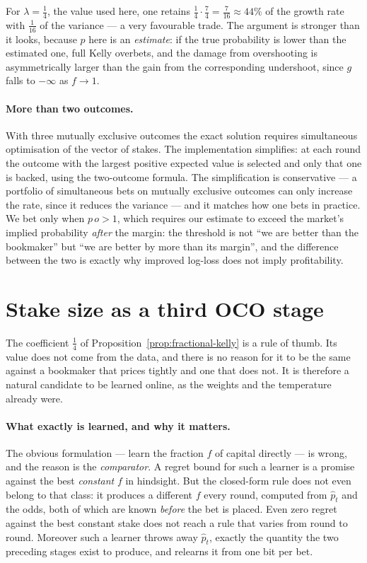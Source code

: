 \documentclass[12pt,a4paper,oneside]{report}
\renewcommand{\_}{\oldunderscore\allowbreak}
\theoremstyle{definition}
\theoremstyle{plain}
\theoremstyle{remark}
\begin{document}
For $\lambda=\tfrac14$, the value used here, one retains
$\tfrac14\cdot\tfrac74 = \tfrac{7}{16} \approx 44\%$ of the growth rate with $\tfrac{1}{16}$ of
the variance --- a very favourable trade. The argument is stronger than it looks, because $p$
here is an \emph{estimate}: if the true probability is lower than the estimated one, full Kelly
overbets, and the damage from overshooting is asymmetrically larger than the gain from the
corresponding undershoot, since $g$ falls to $-\infty$ as $f\to 1$.

\paragraph{More than two outcomes.} With three mutually exclusive outcomes the exact solution
requires simultaneous optimisation of the vector of stakes. The implementation simplifies: at
each round the outcome with the largest positive expected value is selected and only that one is
backed, using the two-outcome formula. The simplification is conservative --- a portfolio of
simultaneous bets on mutually exclusive outcomes can only increase the rate, since it reduces the
variance --- and it matches how one bets in practice. We bet only when $p\,o > 1$, which requires
our estimate to exceed the market's implied probability \emph{after} the margin: the threshold is
not ``we are better than the bookmaker'' but ``we are better by more than its margin'', and the
difference between the two is exactly why improved log-loss does not imply profitability.

\section{Stake size as a third OCO stage}
\label{sec:oco-kelly-theory}

The coefficient $\tfrac14$ of Proposition~\ref{prop:fractional-kelly} is a rule of thumb. Its
value does not come from the data, and there is no reason for it to be the same against a
bookmaker that prices tightly and one that does not. It is therefore a natural candidate to be
learned online, as the weights and the temperature already were.

\paragraph{What exactly is learned, and why it matters.} The obvious formulation --- learn the
fraction $f$ of capital directly --- is wrong, and the reason is the \emph{comparator}. A regret
bound for such a learner is a promise against the best \emph{constant} $f$ in hindsight. But the
closed-form rule does not even belong to that class: it produces a different $f$ every round,
computed from $\hat{p}_t$ and the odds, both of which are known \emph{before} the bet is placed.
Even zero regret against the best constant stake does not reach a rule that varies from round to
round. Moreover such a learner throws away $\hat{p}_t$, exactly the quantity the two preceding
stages exist to produce, and relearns it from one bit per bet.
\end{document}
